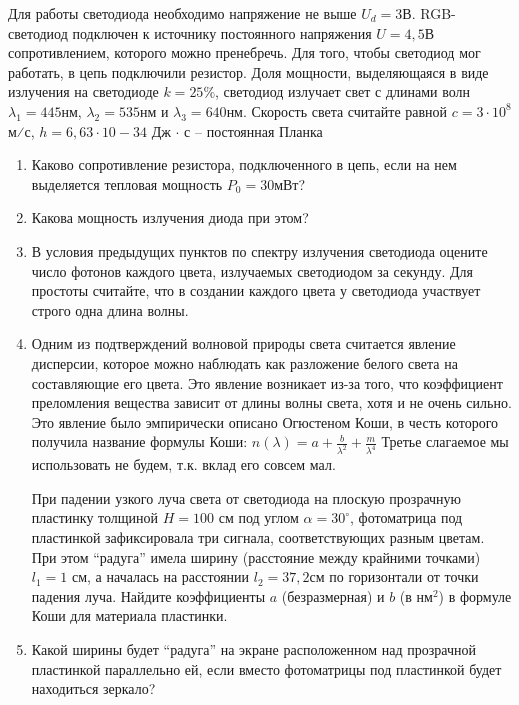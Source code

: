 
Для работы светодиода необходимо напряжение не выше $U_d = 3$В. RGB-светодиод подключен к источнику постоянного 
напряжения $U = 4,5$В сопротивлением, которого можно пренебречь. Для того, чтобы светодиод мог работать, в цепь 
подключили резистор. Доля мощности, выделяющаяся в виде излучения на светодиоде $k = 25\%$, светодиод излучает 
свет с длинами волн $\lambda_1=445$нм, $\lambda_2=535$нм и $\lambda_3=640$нм. Скорость света считайте равной 
$c=3 \cdot 10^8$ м⁄с, $h = 6,63 \cdot 10-{34}$ Дж $\cdot$ с – постоянная Планка

\begin{enumerate}
    \item Каково сопротивление резистора, подключенного в цепь, если на нем выделяется тепловая мощность $P_0 = 30$мВт?
    \item Какова мощность излучения диода при этом?
    \item В условия предыдущих пунктов по спектру излучения светодиода оцените число фотонов каждого цвета, излучаемых светодиодом за секунду. Для простоты считайте, что в создании каждого цвета у светодиода участвует строго одна длина волны.
    \item Одним из подтверждений волновой природы света считается явление дисперсии, которое можно наблюдать 
    как разложение белого света на составляющие его цвета. Это явление возникает из-за того, что коэффициент 
    преломления вещества зависит от длины волны света, хотя и не очень сильно. Это явление было эмпирически 
    описано Огюстеном Коши, в честь которого получила название формулы Коши: $n(\lambda)=a+\frac{b}{\lambda^2} + \frac{m}{\lambda^4}$  
    Третье слагаемое мы использовать не будем, т.к. вклад его совсем мал.
    
    При падении узкого луча света от светодиода на плоскую прозрачную пластинку толщиной $H = 100$ см под углом 
    $\alpha = 30^{\circ}$, фотоматрица под пластинкой зафиксировала три сигнала, соответствующих разным цветам. 
    При этом “радуга” имела ширину (расстояние между крайними точками) $l_1 = 1$ см, а началась на расстоянии 
    $l_2 = 37,2$см по горизонтали от точки падения луча. Найдите коэффициенты $a$ (безразмерная) и $b$ (в нм$^2$) в 
    формуле Коши для материала пластинки.
    \item Какой ширины будет “радуга” на экране расположенном над прозрачной пластинкой параллельно ей, если вместо фотоматрицы под пластинкой будет находиться зеркало?
\end{enumerate}